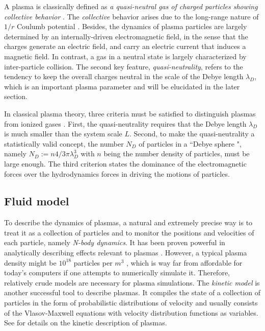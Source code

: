\documentclass{report}
\begin{document}
A plasma is classically defined as \emph{a quasi-neutral gas of charged particles showing collective behavior} \citep{chen_1994}. The \emph{collective} behavior arises due to the long-range nature of $1/r$ Coulumb potential \citep{gibbon2020}. Besides, the dynamics of plasma particles are largely determined by an internally-driven electromagnetic field, in the sense that the charges generate an electric field, and carry an electric current that induces a magnetic field. In contrast, a gas in a neutral state is largely characterized by inter-particle collision. The second key feature, \emph{quasi-neutrality}, refers to the tendency to keep the overall charges neutral in the scale of the Debye length $\lambda_D$, which is an important plasma parameter and will be elucidated in the later section. 

In classical plasma theory, three criteria must be satisfied to distinguish plasmas from ionized gases \citep{chen2016}. First, the quasi-neutrality requires that the Debye length $\lambda_D$ is much smaller than the system scale $L$. Second, to make the quasi-neutrality a statistically valid concept, the number $N_D$ of particles in a ``Debye sphere ", namely $N_D := n4/3\pi\lambda_D^3$ with $n$ being the number density of particles, must be large enough. The third criterion states the dominance of the electromagnetic forces over the hydrodynamics forces in driving the motions of particles.

\subsection{Fluid model}
To describe the dynamics of plasmas, a natural and extremely precise way is to treat it as a collection of particles and to monitor the positions and velocities of each particle, namely \emph{N-body dynamics}. It has been proven powerful in analytically describing effects relevant to plasmas \citep{escande2015}.  However, a typical plasma density might be $10^{18}$ particles per $m^3$ \citep{chen2016}, which is way far from affordable for today's computers if one attempts to numerically simulate it. Therefore, relatively crude models are necessary for plasma simulations. The \emph{kinetic model} is another successful tool to describe plasmas. It compiles the state of a collection of particles in the form of probabilistic distributions of velocity and usually consists of the Vlasov-Maxwell equations with velocity distribution functions as variables. See \cite{chaudhary2018} for details on the kinetic description of plasmas.  
\end{document}

